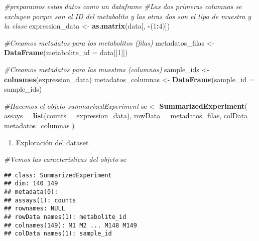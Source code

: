 \documentclass[
]{article}
\newenvironment{Shaded}{\begin{snugshade}}{\end{snugshade}}
\newcommand{\AttributeTok}[1]{\textcolor[rgb]{0.13,0.29,0.53}{#1}}
\newcommand{\CommentTok}[1]{\textcolor[rgb]{0.56,0.35,0.01}{\textit{#1}}}
\newcommand{\DecValTok}[1]{\textcolor[rgb]{0.00,0.00,0.81}{#1}}
\newcommand{\FunctionTok}[1]{\textcolor[rgb]{0.13,0.29,0.53}{\textbf{#1}}}
\newcommand{\NormalTok}[1]{#1}
\newcommand{\OtherTok}[1]{\textcolor[rgb]{0.56,0.35,0.01}{#1}}
\newcommand{\SpecialCharTok}[1]{\textcolor[rgb]{0.81,0.36,0.00}{\textbf{#1}}}
\providecommand{\tightlist}{%
  \setlength{\itemsep}{0pt}\setlength{\parskip}{0pt}}
\begin{document}
\begin{Shaded}
\begin{Highlighting}[]
\CommentTok{\#preparamos estos datos como un dataframe}
\CommentTok{\#Las dos primeras columnas se excluyen porque son el ID del metabolito y las otras dos son el tipo de muestra y la clase}
\NormalTok{expression\_data }\OtherTok{\textless{}{-}} \FunctionTok{as.matrix}\NormalTok{(data[, }\SpecialCharTok{{-}}\NormalTok{(}\DecValTok{1}\SpecialCharTok{:}\DecValTok{4}\NormalTok{)])  }

\CommentTok{\#Creamos metadatos para los metabolitos (filas)}
\NormalTok{metadatos\_filas }\OtherTok{\textless{}{-}} \FunctionTok{DataFrame}\NormalTok{(}\AttributeTok{metabolite\_id =}\NormalTok{ data[[}\DecValTok{1}\NormalTok{]])}

\CommentTok{\#Creamos metadatos para las muestras (columnas)}
\NormalTok{sample\_ids }\OtherTok{\textless{}{-}} \FunctionTok{colnames}\NormalTok{(expression\_data)}
\NormalTok{metadatos\_columnas }\OtherTok{\textless{}{-}} \FunctionTok{DataFrame}\NormalTok{(}\AttributeTok{sample\_id =}\NormalTok{ sample\_ids)}

\CommentTok{\#Hacemos el objeto summarizedExperiment}
\NormalTok{se }\OtherTok{\textless{}{-}} \FunctionTok{SummarizedExperiment}\NormalTok{(}
    \AttributeTok{assays =} \FunctionTok{list}\NormalTok{(}\AttributeTok{counts =}\NormalTok{ expression\_data),}
    \AttributeTok{rowData =}\NormalTok{ metadatos\_filas,}
    \AttributeTok{colData =}\NormalTok{ metadatos\_columnas}
\NormalTok{)}
\end{Highlighting}
\end{Shaded}

\begin{enumerate}
\def\labelenumi{\arabic{enumi}.}
\setcounter{enumi}{2}
\tightlist
\item
  Exploración del dataset
\end{enumerate}

\begin{Shaded}
\begin{Highlighting}[]
\CommentTok{\#Vemos las caracteristicas del objeto }
\NormalTok{se}
\end{Highlighting}
\end{Shaded}

\begin{verbatim}
## class: SummarizedExperiment 
## dim: 140 149 
## metadata(0):
## assays(1): counts
## rownames: NULL
## rowData names(1): metabolite_id
## colnames(149): M1 M2 ... M148 M149
## colData names(1): sample_id
\end{verbatim}
\end{document}
